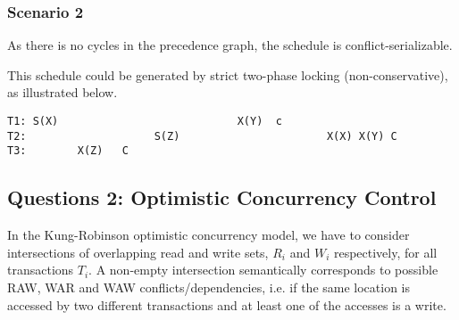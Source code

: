 \documentclass[11pt,a4paper,english]{article}
\begin{document}
\subsubsection{Scenario 2}


\begin{figure}[H]
\centering
{}
\end{figure}


As there is no cycles in the precedence graph, the schedule is conflict-serializable.

This schedule could be generated by strict two-phase locking (non-conservative),
as illustrated below.

\begin{verbatim}
T1: S(X)                            X(Y)  c
T2:                    S(Z)                       X(X) X(Y) C
T3:        X(Z)   C
\end{verbatim}

\subsection{Questions 2: Optimistic Concurrency Control}
In the Kung-Robinson optimistic concurrency model, we have to consider
intersections of overlapping read and write sets, $R_{i}$ and $W_{i}$
respectively, for all transactions $T_{i}$. A non-empty intersection
semantically corresponds to possible RAW, WAR and WAW conflicts/dependencies,
i.e. if the same location is accessed by two different transactions and at least
one of the accesses is a write.
\end{document}
